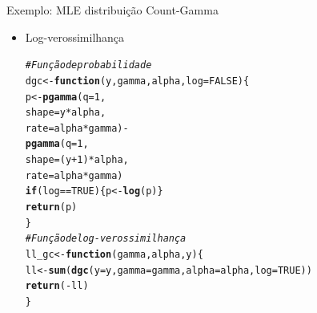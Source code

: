\documentclass[10pt, aspectratio=169]{beamer}\usepackage[]{graphicx}\usepackage[]{color}
\makeatletter
\newcommand{\hlnum}[1]{\textcolor[rgb]{0.686,0.059,0.569}{#1}}%
\newcommand{\hlcom}[1]{\textcolor[rgb]{0.678,0.584,0.686}{\textit{#1}}}%
\newcommand{\hlopt}[1]{\textcolor[rgb]{0,0,0}{#1}}%
\newcommand{\hlstd}[1]{\textcolor[rgb]{0.345,0.345,0.345}{#1}}%
\newcommand{\hlkwa}[1]{\textcolor[rgb]{0.161,0.373,0.58}{\textbf{#1}}}%
\newcommand{\hlkwb}[1]{\textcolor[rgb]{0.69,0.353,0.396}{#1}}%
\newcommand{\hlkwc}[1]{\textcolor[rgb]{0.333,0.667,0.333}{#1}}%
\newcommand{\hlkwd}[1]{\textcolor[rgb]{0.737,0.353,0.396}{\textbf{#1}}}%
\newenvironment{kframe}{%
 \def\at@end@of@kframe{}%
 \ifinner\ifhmode%
  \def\at@end@of@kframe{\end{minipage}}%
  \begin{minipage}{\columnwidth}%
 \fi\fi%
 \def\FrameCommand##1{\hskip\@totalleftmargin \hskip-\fboxsep
 \colorbox{shadecolor}{##1}\hskip-\fboxsep
     \hskip-\linewidth \hskip-\@totalleftmargin \hskip\columnwidth}%
 \MakeFramed {\advance\hsize-\width
   \@totalleftmargin\z@ \linewidth\hsize
   \@setminipage}}%
 {\par\unskip\endMakeFramed%
 \at@end@of@kframe}
\newenvironment{knitrout}{}{} %
\makeatother
\begin{document}
\begin{frame}[fragile]{Exemplo: MLE distribuição Count-Gamma}
\begin{itemize}
  \item Log-verossimilhança
\begin{knitrout}
\color{fgcolor}\begin{kframe}
\begin{alltt}
\hlcom{# Função de probabilidade}
\hlstd{dgc} \hlkwb{<-} \hlkwa{function}\hlstd{(}\hlkwc{y}\hlstd{,} \hlkwc{gamma}\hlstd{,} \hlkwc{alpha}\hlstd{,} \hlkwc{log} \hlstd{=} \hlnum{FALSE}\hlstd{) \{}
  \hlstd{p} \hlkwb{<-} \hlkwd{pgamma}\hlstd{(}\hlkwc{q} \hlstd{=} \hlnum{1}\hlstd{,}
              \hlkwc{shape} \hlstd{= y} \hlopt{*} \hlstd{alpha,}
              \hlkwc{rate} \hlstd{= alpha} \hlopt{*} \hlstd{gamma)} \hlopt{-}
    \hlkwd{pgamma}\hlstd{(}\hlkwc{q} \hlstd{=} \hlnum{1}\hlstd{,}
           \hlkwc{shape} \hlstd{= (y} \hlopt{+} \hlnum{1}\hlstd{)} \hlopt{*} \hlstd{alpha,}
           \hlkwc{rate} \hlstd{= alpha} \hlopt{*} \hlstd{gamma)}
  \hlkwa{if}\hlstd{(log} \hlopt{==} \hlnum{TRUE}\hlstd{) \{p} \hlkwb{<-} \hlkwd{log}\hlstd{(p)\}}
  \hlkwd{return}\hlstd{(p)}
\hlstd{\}}
\hlcom{# Função de log-verossimilhança}
\hlstd{ll_gc} \hlkwb{<-} \hlkwa{function}\hlstd{(}\hlkwc{gamma}\hlstd{,} \hlkwc{alpha}\hlstd{,} \hlkwc{y}\hlstd{) \{}
  \hlstd{ll} \hlkwb{<-} \hlkwd{sum}\hlstd{(}\hlkwd{dgc}\hlstd{(}\hlkwc{y} \hlstd{= y,} \hlkwc{gamma} \hlstd{= gamma,} \hlkwc{alpha} \hlstd{= alpha,} \hlkwc{log} \hlstd{=} \hlnum{TRUE}\hlstd{))}
  \hlkwd{return}\hlstd{(}\hlopt{-}\hlstd{ll)}
\hlstd{\}}
\end{alltt}
\end{kframe}
\end{knitrout}

\end{itemize}
\end{frame}
\end{document}
